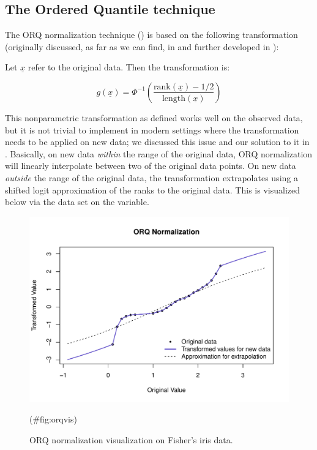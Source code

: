 \hypertarget{the-ordered-quantile-technique}{%
\subsection{The Ordered Quantile
technique}\label{the-ordered-quantile-technique}}

The ORQ normalization technique () is based on the
following transformation (originally discussed, as far as we can find,
in \citet{bartlett1947} and further developed in \citet{van1952}):

Let \(\underline x\) refer to the original data. Then the transformation
is:

\[
g(\underline x) = \Phi ^{-1} \left(\frac{\text{rank} (\underline x) - 1/2}{\text{length}(\underline x) }\right)
\]

This nonparametric transformation as defined works well on the observed
data, but it is not trivial to implement in modern settings where the
transformation needs to be applied on new data; we discussed this issue
and our solution to it in \citet{orq_paper}. Basically, on new data
\emph{within} the range of the original data, ORQ normalization will
linearly interpolate between two of the original data points. On new
data \emph{outside} the range of the original data, the transformation
extrapolates using a shifted logit approximation of the ranks to the
original data. This is visualized below via the  data set on
the  variable.

\begin{Schunk}
\begin{figure}

{\centering \includegraphics[width=1\linewidth]{figs/orqvis-1} 

}

\caption[ORQ normalization visualization on Fisher's iris data]{ORQ normalization visualization on Fisher's iris data.}(\#fig:orqvis)
\end{figure}
\end{Schunk}

